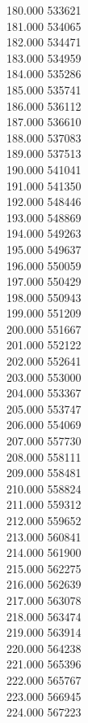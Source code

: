{ 180.000	533621 \\
 181.000	534065 \\
 182.000	534471 \\
 183.000	534959 \\
 184.000	535286 \\
 185.000	535741 \\
 186.000	536112 \\
 187.000	536610 \\
 188.000	537083 \\
 189.000	537513 \\
 190.000	541041 \\
 191.000	541350 \\
 192.000	548446 \\
 193.000	548869 \\
 194.000	549263 \\
 195.000	549637 \\
 196.000	550059 \\
 197.000	550429 \\
 198.000	550943 \\
 199.000	551209 \\
 200.000	551667 \\
 201.000	552122 \\
 202.000	552641 \\
 203.000	553000 \\
 204.000	553367 \\
 205.000	553747 \\
 206.000	554069 \\
 207.000	557730 \\
 208.000	558111 \\
 209.000	558481 \\
 210.000	558824 \\
 211.000	559312 \\
 212.000	559652 \\
 213.000	560841 \\
 214.000	561900 \\
 215.000	562275 \\
 216.000	562639 \\
 217.000	563078 \\
 218.000	563474 \\
 219.000	563914 \\
 220.000	564238 \\
 221.000	565396 \\
 222.000	565767 \\
 223.000	566945 \\
 224.000	567223 \\
}
